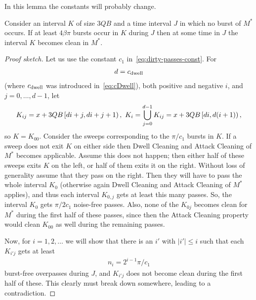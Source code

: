 \documentclass[12pt]{memoir}
\renewcommand{\le}{\leq}
\def\B{B}
\newcommand{\Q}{Q}
\newcommand{\Cns}[2]{#1_{\textrm{\upshape #2}}}
\newcommand{\cns}[1]{\Cns{c}{#1}}
\newcommand{\cDwell}{\cns{dwell}}
\begin{document}
In this lemma the constants will probably change.
\begin{lemma}\label{lem:burst-density}
Consider an interval \( K \) of size \( 3 \Q\B \) and a time interval \( J \) in which
no burst of \( M^{*} \) occurs.
If at least \( 4\beta\pi \) bursts occur in \( K \) during \( J \) then at some time in \( J \)
the interval \( K \) becomes clean in \( M^{*} \).
\end{lemma}
\begin{proof}[Proof sketch]
Let us use the constant \( c_{1} \) in~\eqref{eq:dirty-passes-const}.
For 
\begin{align*}
 d=\cDwell
\end{align*}
(where \( \cDwell \) was introduced in~\eqref{eq:cDwell}),
both positive and negative \( i \), and \( j=0,\dots,d-1 \), let
\begin{align*}
   K_{ij}=x+3\Q\B\lint{d i+j}{d i+j+1},\ 
K_{i}=\bigcup_{j=0}^{d-1}K_{ij}=x+3\Q\B\lint{d i}{d(i+1)},
 \end{align*}
so \( K=K_{00} \).
Consider the sweeps corresponding to the \( \pi/c_{1} \) bursts in \( K \).
If a sweep does not exit \( K \) on either side then Dwell Cleaning and Attack Cleaning
of \( M^{*} \) becomes applicable.
Assume this does not happen; then
either half of these sweeps exits \( K \) on the left, or half of them exits it on the right.
Without loss of generality assume that they pass on the right.
Then they will have to pass the whole interval \( K_{0} \) (otherwise again Dwell Cleaning
and Attack Cleaning of \( M^{*} \)
applies), and thus each interval \( K_{0,j} \) gets at least this many passes.
So, the interval \( K_{0} \) gets \( \pi/2c_{1} \) noise-free passes.
Also, none of the \( K_{0j} \) becomes clean for \( M^{*} \) during the first half of these passes,
since then the Attack Cleaning property would clean \( K_{00} \) as well during the remaining
passes.

Now, for \( i=1,2,\dots \) we will show that there is 
an \( i'  \) with \( |i'|\le i \) such that each \( K_{i'j} \) gets at least 
\begin{align*}
  n_{i}= 2^{i-1}\pi/c_{1} 
\end{align*}
 burst-free overpasses  during \( J \), 
and \( K_{i'j} \) does not become clean during the first half of these.
This clearly must break down somewhere, leading to a contradiction.


\end{proof}
\end{document}
